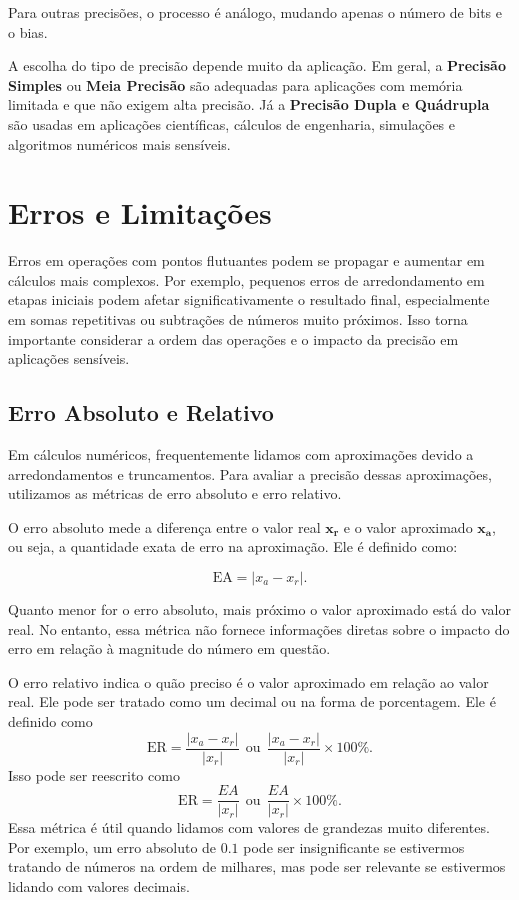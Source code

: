 Para outras precisões, o processo é análogo, mudando apenas o número de bits e
o bias.

A escolha do tipo de precisão depende muito da aplicação. Em geral, a
\textbf{Precisão Simples} ou \textbf{Meia Precisão} são adequadas para
aplicações com memória limitada e que não exigem alta precisão. Já a
\textbf{Precisão Dupla e Quádrupla} são usadas em aplicações científicas,
cálculos de engenharia, simulações e algoritmos numéricos mais sensíveis.

\section{Erros e Limitações}\label{subsec:erroselim}

Erros em operações com pontos flutuantes podem se propagar e aumentar em
cálculos mais complexos. Por exemplo, pequenos erros de arredondamento em
etapas iniciais podem afetar significativamente o resultado final,
especialmente em somas repetitivas ou subtrações de números muito próximos.
Isso torna importante considerar a ordem das operações e o impacto da precisão
em aplicações sensíveis.

\subsection{Erro Absoluto e Relativo}

Em cálculos numéricos, frequentemente lidamos com aproximações devido a
arredondamentos e truncamentos. Para avaliar a precisão dessas aproximações,
utilizamos as métricas de erro absoluto e erro relativo.

O erro absoluto mede a diferença entre o valor real \(\boldsymbol{x_r}\) e o
valor aproximado \(\boldsymbol{x_a}\), ou seja, a quantidade exata de erro na
aproximação. Ele é definido como:

\begin{equation}
  \text{EA} = |x_a - x_r|.
\end{equation}

Quanto menor for o erro absoluto, mais próximo o valor aproximado está do valor
real. No entanto, essa métrica não fornece informações diretas sobre o impacto
do erro em relação à magnitude do número em questão.

O erro relativo indica o quão preciso é o valor aproximado em relação ao valor
real. Ele pode ser tratado como um decimal ou na forma de porcentagem. Ele é
definido como
\begin{equation}
  \text{ER} = \frac{|x_a - x_r|}{|x_r|}\ \ \textrm{ou}\ \ \frac{|x_a - x_r|}{|x_r|}\times 100\%.
\end{equation}
Isso pode ser reescrito como
\begin{equation}
  \text{ER} = \frac{{EA}}{|x_r|}\ \ \textrm{ou}\ \ \frac{{EA}}{|x_r|}\times 100\%.
\end{equation}
Essa métrica é útil quando lidamos com valores de grandezas muito diferentes. Por exemplo, um erro absoluto de \( 0.1 \) pode ser insignificante se estivermos tratando de números na ordem de milhares, mas pode ser relevante se estivermos lidando com valores decimais.

